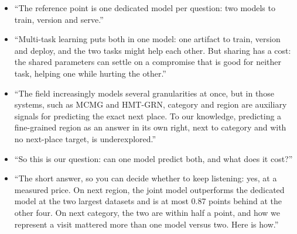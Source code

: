 \say
\begin{itemize}
  \item ``The reference point is one dedicated model per question: two models to train, version and
        serve.''
  \item ``Multi-task learning puts both in one model: one artifact to train, version and deploy, and
        the two tasks might help each other. But sharing has a cost: the shared parameters can settle on
        a compromise that is good for neither task, helping one while hurting the other.''
  \item ``The field increasingly models several granularities at once, but in those systems, such as
        MCMG and HMT-GRN, category and region are auxiliary signals for predicting the exact next place. To our
        knowledge, predicting a fine-grained region as an answer in its own right, next to category and
        with no next-place target, is underexplored.''
  \item ``So this is our question: can one model predict both, and what does it cost?''
  \item ``The short answer, so you can decide whether to keep listening: yes, at a measured price. On
        next region, the joint model outperforms the dedicated model at the two largest datasets and is
        at most 0.87 points behind at the other four. On next category, the two are within half a point,
        and how we represent a visit mattered more than one model versus two. Here
        is how.''
\end{itemize}

